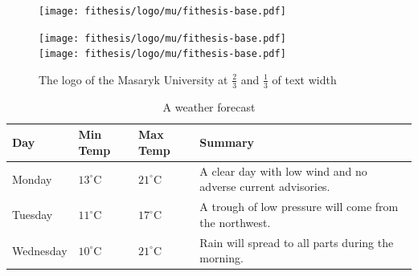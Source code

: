 \documentclass[
  digital, %
  table,   %
  lof,     %
  lot,     %
]{fithesis3}
\begin{document}
\begin{figure}
  \begin{minipage}{.66\textwidth}
    \texttt{[image: fithesis/logo/mu/fithesis-base.pdf]}
  \end{minipage}
  \begin{minipage}{.33\textwidth}
    \texttt{[image: fithesis/logo/mu/fithesis-base.pdf]} \\
    \texttt{[image: fithesis/logo/mu/fithesis-base.pdf]}
  \end{minipage}
  \caption{The logo of the Masaryk University at $\frac23$ and
    $\frac13$ of text width}
  \label{fig:mulogo2}
\end{figure}

\begin{table}
  \begin{tabularx}{\textwidth}{lllX}
    \toprule
    Day & Min Temp & Max Temp & Summary \\
    \midrule
    Monday & $13^{\circ}\mathrm{C}$ & $21^\circ\mathrm{C}$ & A
    clear day with low wind and no adverse current advisories. \\
    Tuesday & $11^{\circ}\mathrm{C}$ & $17^\circ\mathrm{C}$ & A
    trough of low pressure will come from the northwest. \\
    Wednesday & $10^{\circ}\mathrm{C}$ &
    $21^\circ\mathrm{C}$ & Rain will spread to all parts during the
    morning. \\
    \bottomrule
  \end{tabularx}
  \caption{A weather forecast}
  \label{tab:weather}
\end{table}
\end{document}
